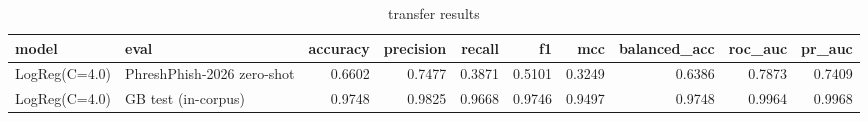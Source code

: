 \begin{table}[htbp]
\caption{transfer results}
\label{tab:transfer_results}
\begin{tabular}{llrrrrrrrr}
\toprule
model & eval & accuracy & precision & recall & f1 & mcc & balanced_acc & roc_auc & pr_auc \\
\midrule
LogReg(C=4.0) & PhreshPhish-2026 zero-shot & 0.6602 & 0.7477 & 0.3871 & 0.5101 & 0.3249 & 0.6386 & 0.7873 & 0.7409 \\
LogReg(C=4.0) & GB test (in-corpus) & 0.9748 & 0.9825 & 0.9668 & 0.9746 & 0.9497 & 0.9748 & 0.9964 & 0.9968 \\
\bottomrule
\end{tabular}
\end{table}
